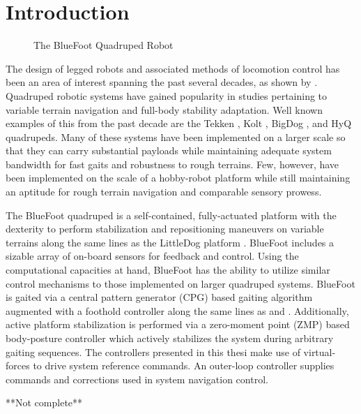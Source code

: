 \chapter{Introduction}
	\begin{figure}[h!]
		\centering
		\caption{The BlueFoot Quadruped Robot}
		\label{fig::bluefoot_glamour}
	\end{figure}
		The design of legged robots and associated methods of locomotion control has been an area of interest spanning the past several decades, as shown by		
		\cite{
		McGhee1965,
		Hodgins1991, 
		Altendorfer2001, 
		Kolter2008
		}.
		Quadruped robotic systems have gained popularity in studies pertaining to variable terrain navigation and full-body stability adaptation. Well known examples of this from the past decade are the Tekken \cite{Fukuoka2003}, Kolt \cite{Estremera2006}, BigDog \cite{BigDog2008}, and HyQ \cite{Semini2010_PHD} quadrupeds. Many of these systems have been implemented on a larger scale so that they can carry substantial payloads while maintaining adequate system bandwidth for fast gaits and robustness to rough terrains. Few, however, have been implemented on the scale of a hobby-robot platform while still maintaining an aptitude for rough terrain navigation and comparable sensory prowess.

		The BlueFoot quadruped is a self-contained, fully-actuated platform with the dexterity to perform stabilization and  repositioning maneuvers on variable terrains along the same lines as the LittleDog platform \cite{Rebula2007}. BlueFoot includes a sizable array of on-board sensors for feedback and control. Using the computational capacities at hand, BlueFoot has the ability to utilize similar control mechanisms to those implemented on larger quadruped systems. BlueFoot is  gaited via a central pattern generator (CPG) based gaiting algorithm augmented with a foothold controller along the same lines as \cite{Ajallooeian2013} and \cite{Rutishauser2008}. Additionally, active platform stabilization is performed via a zero-moment point (ZMP) based body-posture controller which actively stabilizes the system during arbitrary gaiting sequences. The controllers presented in this thesi make use of virtual-forces to drive system reference commands. An outer-loop controller supplies commands and corrections used in system navigation control.

**Not complete**